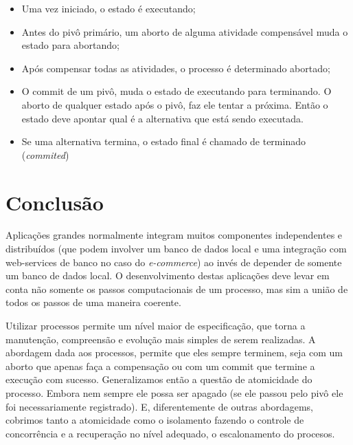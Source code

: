 \documentclass[a4paper,12pt,notitlepage]{article}
\begin{document}
\begin{itemize}
  \item Uma vez iniciado, o estado é executando;
  \item Antes do pivô primário, um aborto de alguma atividade compensável muda o estado para abortando;
  \item Após compensar todas as atividades, o processo é determinado abortado;
  \item O commit de um pivô, muda o estado de executando para terminando. O aborto de qualquer estado após o pivô, faz ele tentar a próxima. Então o estado deve apontar qual é a alternativa que está sendo executada.
  \item Se uma alternativa termina, o estado final é chamado de terminado (\textit{commited})
\end{itemize}

\newpage

\section{Conclusão}

Aplicações grandes normalmente integram muitos componentes independentes e distribuídos (que podem involver um banco de dados local e uma integração com web-services de banco no caso do \textit{e-commerce}) ao invés de depender de 
somente um banco de dados local. O desenvolvimento destas aplicações deve levar em conta não somente os passos computacionais de um processo, mas sim a união de todos os passos de uma maneira coerente. 

Utilizar processos permite um nível maior de especificação, que torna a manutenção, compreensão e evolução mais simples de serem realizadas. A abordagem dada aos processos, permite que eles sempre terminem, seja com um aborto que apenas faça a compensação ou com um commit que termine a execução com sucesso. Generalizamos então a questão de atomicidade do processo. Embora nem sempre ele possa ser apagado (se ele passou pelo pivô ele foi necessariamente registrado). E, diferentemente de outras abordagems, cobrimos tanto a atomicidade como o isolamento fazendo o controle de concorrência e a recuperação no nível adequado, o escalonamento do procesos.


 
\end{document}
